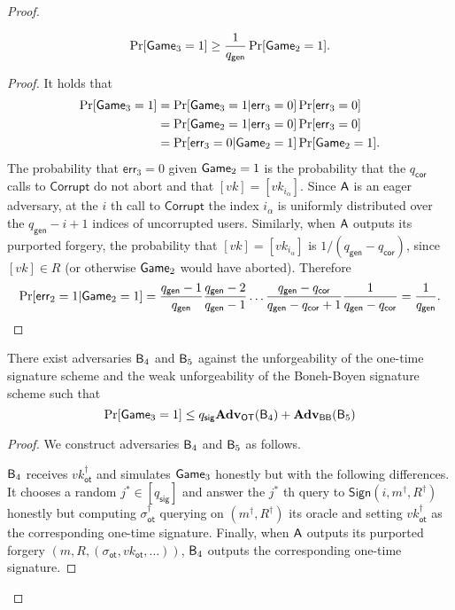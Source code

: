 \begin{proof}
\begin{lemma}
$$
\Pr[\mathsf{Game}_3=1]\geq \frac{1}{{q_\mathsf{gen}}}\Pr[\mathsf{Game}_2=1].
$$
\end{lemma}
\begin{proof}
It holds that
\begin{align*}
\Pr[\mathsf{Game}_3=1] &= \Pr[\mathsf{Game}_3=1|\mathsf{err}_3=0]\Pr[\mathsf{err}_3=0]\\
&=\Pr[\mathsf{Game}_2=1|\mathsf{err}_3=0]\Pr[\mathsf{err}_3=0]\\
&=\Pr[\mathsf{err}_3=0|\mathsf{Game}_2=1]\Pr[\mathsf{Game}_2=1].
\end{align*}
The probability that $\mathsf{err}_3=0$ given $\mathsf{Game}_2=1$ is the probability that the ${q_\mathsf{cor}}$ calls to $\mathsf{Corrupt}$ do not abort and that $[vk]=[vk_{i_\alpha}]$. Since $\mathsf{A}$ is an eager adversary, at the $i$ th call to $\mathsf{Corrupt}$ the index $i_\alpha$ is uniformly distributed over the ${q_\mathsf{gen}}-i+1$ indices of uncorrupted users. Similarly, when $\mathsf{A}$ outputs its purported forgery, the probability that $[vk]=[vk_{i_\alpha}]$ is $1/({q_\mathsf{gen}}-{q_\mathsf{cor}})$, since $[vk]\in R$ (or otherwise $\mathsf{Game}_2$ would have aborted). Therefore
$$
\Pr[\mathsf{err}_2=1|\mathsf{Game}_2=1]=\frac{{q_\mathsf{gen}}-1}{{q_\mathsf{gen}}}\frac{{q_\mathsf{gen}}-2}{{q_\mathsf{gen}}-1}\ldots\frac{{q_\mathsf{gen}}-{q_\mathsf{cor}}}{{q_\mathsf{gen}}-{q_\mathsf{cor}}+1}\frac{1}{{q_\mathsf{gen}}-{q_\mathsf{cor}}}=\frac{1}{{q_\mathsf{gen}}}.
$$ 
\end{proof}

\begin{lemma}  There exist adversaries $\mathsf{B}_4$ and $\mathsf{B}_5$ against the unforgeability of the one-time signature scheme and the weak unforgeability of the Boneh-Boyen signature scheme such that
$$
\Pr[\mathsf{Game}_3=1]\leq q_\mathsf{sig}\mathbf{Adv}_{\mathsf{OT}}(\mathsf{B}_4)+\mathbf{Adv}_{\mathsf{BB}}(\mathsf{B}_5)
$$
\end{lemma}
\begin{proof}
We construct adversaries $\mathsf{B}_4$ and $\mathsf{B}_5$ as follows.

$\mathsf{B}_4$ receives $vk_\mathsf{ot}^\dag$ and simulates $\mathsf{Game}_3$ honestly but with the following differences. It chooses a random $j^*\in[q_\mathsf{sig}]$ and answer the $j^*$ th query to $\mathsf{Sign}(i,m^\dag,R^\dag)$ honestly but computing $\sigma_\mathsf{ot}^\dag$ querying on $(m^\dag,R^\dag)$ its oracle and setting $vk_\mathsf{ot}^\dag$ as the corresponding one-time signature. Finally, when $\mathsf{A}$ outputs its purported forgery $(m,R,(\sigma_\mathsf{ot},vk_\mathsf{ot},\ldots))$, $\mathsf{B}_4$ outputs the corresponding one-time signature.


\end{proof}
\end{proof}
